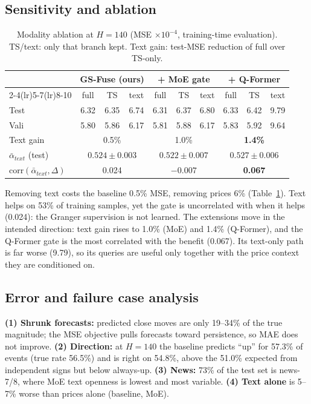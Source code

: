 \documentclass{article}
\begin{document}
\subsection{Sensitivity and ablation}
\begin{table}[t]
\caption{Modality ablation at $H=140$ (MSE $\times10^{-4}$, training-time evaluation). TS/text: only that branch kept. Text gain: test-MSE reduction of full over TS-only.}
\label{tab:abl}
\centering\small
\setlength{\tabcolsep}{4pt}
\begin{tabular}{l ccc ccc ccc}
\toprule
& \multicolumn{3}{c}{GS-Fuse (ours)} & \multicolumn{3}{c}{+ MoE gate} & \multicolumn{3}{c}{+ Q-Former} \\
\cmidrule(lr){2-4}\cmidrule(lr){5-7}\cmidrule(lr){8-10}
& full & TS & text & full & TS & text & full & TS & text \\
\midrule
Test & 6.32 & 6.35 & 6.74 & 6.31 & 6.37 & 6.80 & 6.33 & 6.42 & 9.79 \\
Vali & 5.80 & 5.86 & 6.17 & 5.81 & 5.88 & 6.17 & 5.83 & 5.92 & 9.64 \\
Text gain & \multicolumn{3}{c}{0.5\%} & \multicolumn{3}{c}{1.0\%} & \multicolumn{3}{c}{\textbf{1.4\%}} \\
$\bar\alpha_{text}$ (test) & \multicolumn{3}{c}{$0.524\pm0.003$} & \multicolumn{3}{c}{$0.522\pm0.007$} & \multicolumn{3}{c}{$0.527\pm0.006$} \\
$\mathrm{corr}(\bar\alpha_{text},\Delta)$ & \multicolumn{3}{c}{0.024} & \multicolumn{3}{c}{$-0.007$} & \multicolumn{3}{c}{\textbf{0.067}} \\
\bottomrule
\end{tabular}
\end{table}
Removing text costs the baseline 0.5\% MSE, removing prices 6\% (Table~\ref{tab:abl}). Text helps on 53\% of training samples, yet the gate is uncorrelated with when it helps (0.024): the Granger supervision is not learned. The extensions move in the intended direction: text gain rises to 1.0\% (MoE) and 1.4\% (Q-Former), and the Q-Former gate is the most correlated with the benefit (0.067). Its text-only path is far worse (9.79), so its queries are useful only together with the price context they are conditioned on.

\subsection{Error and failure case analysis}
\textbf{(1) Shrunk forecasts:} predicted close moves are only 19--34\% of the true magnitude; the MSE objective pulls forecasts toward persistence, so MAE does not improve.
\textbf{(2) Direction:} at $H=140$ the baseline predicts ``up'' for 57.3\% of events (true rate 56.5\%) and is right on 54.8\%, above the 51.0\% expected from independent signs but below always-up.
\textbf{(3) News:} 73\% of the test set is news-7/8, where MoE text openness is lowest and most variable.
\textbf{(4) Text alone} is 5--7\% worse than prices alone (baseline, MoE).
\end{document}

